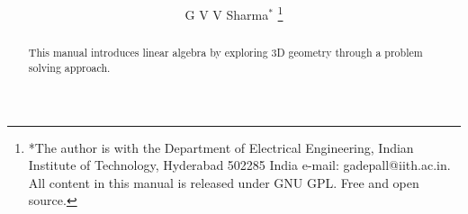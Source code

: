 \documentclass[journal,12pt,twocolumn]{IEEEtran}
\renewcommand\thesection{\arabic{section}}
\begin{document}
\let\StandardTheFigure\thefigure
\renewcommand{\thefigure}{\thesection}



\makeatletter
{}
\makeatother

\let\StandardTheFigure\thefigure
\let\StandardTheTable\thetable
\let\vec\mathbf





\def\putbox#1#2#3{\makebox[0in][l]{\makebox[#1][l]{}\raisebox{\baselineskip}[0in][0in]{\raisebox{#2}[0in][0in]{#3}}}}
     \def\rightbox#1{\makebox[0in][r]{#1}}
     \def\centbox#1{\makebox[0in]{#1}}
     \def\topbox#1{\raisebox{-\baselineskip}[0in][0in]{#1}}
     \def\midbox#1{\raisebox{-0.5\baselineskip}[0in][0in]{#1}}

\vspace{3cm}

\title{ 
}

\author{ G V V Sharma$^{*}$%
	\thanks{*The author is with the Department
		of Electrical Engineering, Indian Institute of Technology, Hyderabad
		502285 India e-mail:  gadepall@iith.ac.in. All content in this manual is released under GNU GPL.  Free and open source.}
	
}	

\maketitle

\tableofcontents

\bigskip

\renewcommand{\thefigure}{\theenumi}
\renewcommand{\thetable}{\theenumi}


\begin{abstract}
	
This manual introduces linear algebra by exploring 3D geometry through a problem solving approach.
\end{abstract}
\end{document}
